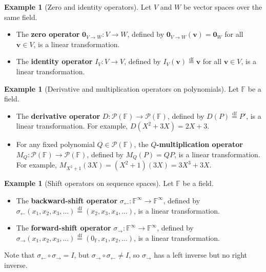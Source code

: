 \documentclass[11pt, a4paper, notitlepage]{report}
\theoremstyle{definition}
\newtheorem{example}[theorem]{Example}
\theoremstyle{remark}
\begin{document}
\begin{example}[Zero and identity operators]\label{ex:zero-identity-op}
Let $V$ and $W$ be vector spaces over the same field.
\begin{itemize}
  \item The \textbf{zero operator} $\mathbf{0}_{V \to W} : V \to W$, defined by
        $\mathbf{0}_{V\to W}(\mathbf{v}) = \mathbf{0}_W$ for all $\mathbf{v} \in V$,
        is a linear transformation.
  \item The \textbf{identity operator} $I_V : V \to V$, defined by
        $I_V(\mathbf{v}) \stackrel{\mathrm{df}}{=} \mathbf{v}$ for all $\mathbf{v} \in V$,
        is a linear transformation.
\end{itemize}
\end{example}

\begin{example}[Derivative and multiplication operators on polynomials]\label{ex:deriv-mult-op}
Let $\mathbb{F}$ be a field.
\begin{itemize}
  \item The \textbf{derivative operator} $D : \mathscr{P}(\mathbb{F}) \to \mathscr{P}(\mathbb{F})$,
        defined by $D(P) \stackrel{\mathrm{df}}{=} P'$, is a linear transformation.
        For example, $D(X^2 + 3X) = 2X + 3$.
  \item For any fixed polynomial $Q \in \mathscr{P}(\mathbb{F})$, the
        \textbf{$Q$-multiplication operator} $M_Q : \mathscr{P}(\mathbb{F}) \to \mathscr{P}(\mathbb{F})$,
        defined by $M_Q(P) = QP$, is a linear transformation.
        For example, $M_{X^2+1}(3X) = (X^2+1)(3X) = 3X^3 + 3X$.
\end{itemize}
\end{example}

\begin{example}[Shift operators on sequence spaces]\label{ex:shift-ops}
Let $\mathbb{F}$ be a field.
\begin{itemize}
  \item The \textbf{backward-shift operator} $\sigma_\leftarrow : \mathbb{F}^\infty \to \mathbb{F}^\infty$,
        defined by $\sigma_\leftarrow(x_1,x_2,x_3,\ldots) \stackrel{\mathrm{df}}{=} (x_2,x_3,x_4,\ldots)$,
        is a linear transformation.
  \item The \textbf{forward-shift operator} $\sigma_\to : \mathbb{F}^\infty \to \mathbb{F}^\infty$,
        defined by $\sigma_\to(x_1,x_2,x_3,\ldots) \stackrel{\mathrm{df}}{=} (0_\mathbb{F},x_1,x_2,\ldots)$,
        is a linear transformation.
\end{itemize}
Note that $\sigma_\leftarrow \circ \sigma_\to = I$, but $\sigma_\to \circ \sigma_\leftarrow \neq I$,
so $\sigma_\to$ has a left inverse but no right inverse.
\end{example}
\end{document}
